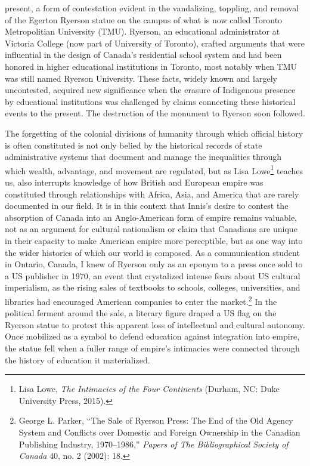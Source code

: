 \documentclass{tufte-handout}
\begin{document}
present, a form of contestation evident in the vandalizing, toppling,
and removal of the Egerton Ryerson statue on the campus of what is now
called Toronto Metropolitian University (TMU). Ryerson, an educational
administrator at Victoria College (now part of University of Toronto),
crafted arguments that were influential in the design of Canada's
residential school system and had been honored in higher educational
institutions in Toronto, most notably when TMU was still named Ryerson
University. These facts, widely known and largely uncontested, acquired
new significance when the erasure of Indigenous presence by educational
institutions was challenged by claims connecting these historical events
to the present. The destruction of the monument to Ryerson soon
followed.

The forgetting of the colonial divisions of humanity through which
official history is often constituted is not only belied by the
historical records of state administrative systems that document and
manage the inequalities through which wealth, advantage, and movement
are regulated, but as Lisa Lowe\footnote{Lisa Lowe, \emph{The Intimacies
  of the Four Continents} (Durham, NC: Duke University Press, 2015).}
teaches us, also interrupts knowledge of how British and European empire
was constituted through relationships with Africa, Asia, and America
that are rarely documented in our field. It is in this context that
Innis's desire to contest the absorption of Canada into an
Anglo-American form of empire remains valuable, not as an argument for
cultural nationalism or claim that Canadians are unique in their
capacity to make American empire more perceptible, but as one way into
the wider histories of which our world is composed. As a communication
student in Ontario, Canada, I knew of Ryerson only as an eponym to a
press once sold to a US publisher in 1970, an event that crystalized
intense fears about US cultural imperialism, as the rising sales of
textbooks to schools, colleges, universities, and libraries had
encouraged American companies to enter the market.\footnote{George L.
  Parker, ``The Sale of Ryerson Press: The End of the Old Agency System
  and Conflicts over Domestic and Foreign Ownership in the Canadian
  Publishing Industry, 1970--1986,'' \emph{Papers of The Bibliographical
  Society of Canada} 40, no. 2 (2002): 18.} In the political ferment
around the sale, a literary figure draped a US flag on the Ryerson
statue to protest this apparent loss of intellectual and cultural
autonomy. Once mobilized as a symbol to defend education against
integration into empire, the statue fell when a fuller range of empire's
intimacies were connected through the history of education it
materialized.
\end{document}
